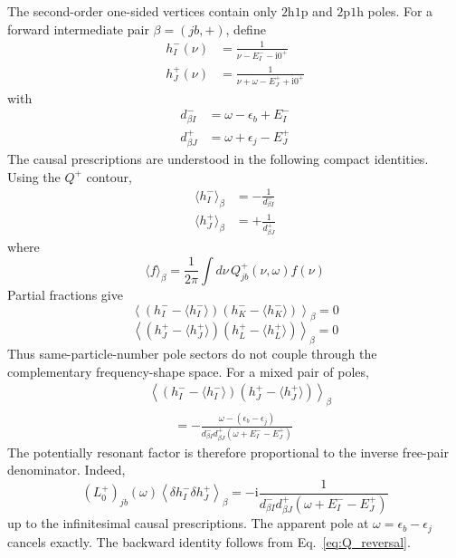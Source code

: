 \documentclass[aip,jcp,reprint,noshowkeys,superscriptaddress]{revtex4-1}
\newcommand{\eps}{\epsilon}
\newcommand{\ii}{\mathrm{i}}
\newcommand{\hhp}{\text{2h1p}}
\newcommand{\pph}{\text{2p1h}}
\begin{document}
The second-order one-sided vertices contain only $\hhp$ and $\pph$ poles.
For a forward intermediate pair $\beta=(jb,+)$, define
\begin{align}
	h^-_I(\nu)
	&=
	\frac{1}{\nu-E^-_I-\ii0^+}
	\\
	h^+_J(\nu)
	&=
	\frac{1}{\nu+\omega-E^+_J+\ii0^+}
	\label{eq:h_pm}
\end{align}
with
\begin{align}
	d^-_{\beta I}
	&=
	\omega-\eps_b+E^-_I
	\\
	d^+_{\beta J}
	&=
	\omega+\eps_j-E^+_J
	\label{eq:d_pm}
\end{align}
The causal prescriptions are understood in the following compact identities.
Using the $Q^+$ contour,
\begin{align}
	\langle h^-_I\rangle_\beta
	&=
	-\frac{1}{d^-_{\beta I}}
	\\
	\langle h^+_J\rangle_\beta
	&=
	+\frac{1}{d^+_{\beta J}}
	\label{eq:h_means}
\end{align}
where
\begin{equation}
	\langle f\rangle_\beta
	=
	\frac{1}{2\pi}
	\int d\nu\,
	Q^+_{jb}(\nu,\omega)f(\nu)
	\label{eq:average_def}
\end{equation}
Partial fractions give
\begin{equation}
	\left\langle
	\left(h^-_I-\langle h^-_I\rangle\right)
	\left(h^-_K-\langle h^-_K\rangle\right)
	\right\rangle_\beta
	=
	0
	\label{eq:cov_mm}
\end{equation}
\begin{equation}
	\left\langle
	\left(h^+_J-\langle h^+_J\rangle\right)
	\left(h^+_L-\langle h^+_L\rangle\right)
	\right\rangle_\beta
	=
	0
	\label{eq:cov_pp}
\end{equation}
Thus same-particle-number pole sectors do not couple through the complementary frequency-shape space.
For a mixed pair of poles,
\begin{equation}
	\begin{split}
	&\left\langle
	\left(h^-_I-\langle h^-_I\rangle\right)
	\left(h^+_J-\langle h^+_J\rangle\right)
	\right\rangle_\beta
	\\
	&\qquad=
	-
	\frac{
	\omega-(\eps_b-\eps_j)
	}{
	d^-_{\beta I}
	d^+_{\beta J}
	(\omega+E^-_I-E^+_J)
	}
	\end{split}
	\label{eq:cov_mp}
\end{equation}
The potentially resonant factor is therefore proportional to the inverse free-pair denominator.
Indeed,
\begin{equation}
	(L_0^+)_{jb}(\omega)
	\left\langle
	\delta h^-_I
	\delta h^+_J
	\right\rangle_\beta
	=
	-\ii
	\frac{1}
	{
	d^-_{\beta I}
	d^+_{\beta J}
	(\omega+E^-_I-E^+_J)
	}
	\label{eq:L0_cov_cancel}
\end{equation}
up to the infinitesimal causal prescriptions.
The apparent pole at $\omega=\eps_b-\eps_j$ cancels exactly.
The backward identity follows from Eq.~\eqref{eq:Q_reversal}.
\end{document}
